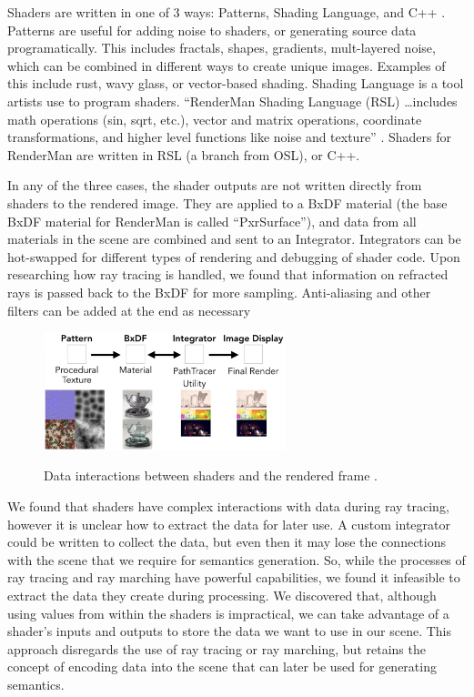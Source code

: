\documentclass[conference]{IEEEtran}
\begin{document}
Shaders are written in one of 3 ways: Patterns, Shading Language, and C++ \cite{shading}.
Patterns are useful for adding noise to shaders, or generating source data
programatically. This includes fractals, shapes, gradients, mult-layered noise,
which can be combined in different ways to create unique images.
Examples of this include rust, wavy glass, or vector-based shading.
Shading Language is a tool artists use to program shaders.
``RenderMan Shading Language (RSL) \dots includes math operations (sin, sqrt, etc.),
vector and matrix operations, coordinate transformations, and higher level functions like noise and texture''
\cite{renderman_docs}.
Shaders for RenderMan are written in RSL (a branch from OSL), or C++.

In any of the three cases, the shader outputs are not written directly
from shaders to the rendered image. They are applied to a BxDF material
(the base BxDF material for RenderMan is called ``PxrSurface''),
and data from all materials in the scene are combined and sent to an Integrator.
Integrators can be hot-swapped for different types of rendering and debugging of
shader code.
Upon researching how ray tracing is handled, we found that information
on refracted rays is passed
back to the BxDF for more sampling.
Anti-aliasing and other filters can be added at the end as necessary

\begin{figure}[htbp]
\centering
{\includegraphics[width=7cm]{interaction.png}}
\caption{Data interactions between shaders and the rendered frame  \cite{renderman}.}
\label{fig:interaction}
\end{figure}

We found that shaders have complex interactions with data during ray tracing,
however it is unclear how to extract the data for later use.
A custom integrator could be written to collect the data, but even then it
may lose the connections with the scene that we require for semantics generation.
So, while the processes of ray tracing and ray marching have powerful capabilities,
we found it infeasible to extract the data they create during processing.
We discovered that, although using values from within the shaders is impractical,
we can take advantage of a shader's inputs and outputs to store the data we want to
use in our scene.
This approach disregards the use of ray tracing or ray marching,
but retains the concept of encoding data into the scene that can later be used
for generating semantics.
\end{document}
